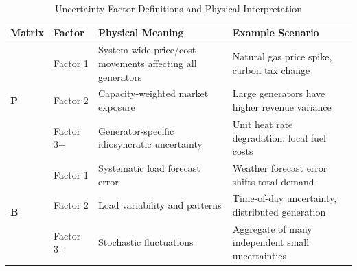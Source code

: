 
\begin{table}[t]
\centering
\caption{Uncertainty Factor Definitions and Physical Interpretation}
\label{tab:uncertainty_factors}
\begin{tabular}{lp{2.5cm}p{5cm}p{4cm}}
\toprule
\textbf{Matrix} & \textbf{Factor} & \textbf{Physical Meaning} & \textbf{Example Scenario} \\
\midrule
\multirow{3}{*}{\textbf{$\mathbf{P}$}}
& Factor 1 & System-wide price/cost movements affecting all generators & Natural gas price spike, carbon tax change \\
\cmidrule{2-4}
& Factor 2 & Capacity-weighted market exposure & Large generators have higher revenue variance \\
\cmidrule{2-4}
& Factor 3+ & Generator-specific idiosyncratic uncertainty & Unit heat rate degradation, local fuel costs \\
\midrule
\multirow{3}{*}{\textbf{$\mathbf{B}$}}
& Factor 1 & Systematic load forecast error & Weather forecast error shifts total demand \\
\cmidrule{2-4}
& Factor 2 & Load variability and patterns & Time-of-day uncertainty, distributed generation \\
\cmidrule{2-4}
& Factor 3+ & Stochastic fluctuations & Aggregate of many independent small uncertainties \\
\bottomrule
\end{tabular}
\end{table}


